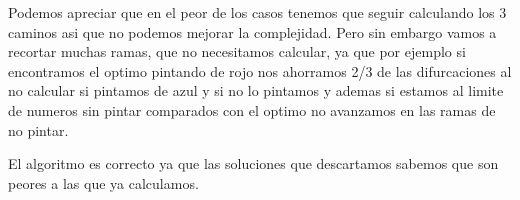 Podemos apreciar que en el peor de los casos tenemos que seguir calculando los 3 caminos asi que no podemos mejorar la complejidad. Pero sin embargo vamos a recortar muchas ramas, que no necesitamos calcular, ya que por ejemplo si encontramos el optimo pintando de rojo nos ahorramos 2/3 de las difurcaciones al no calcular si pintamos de azul y si no lo pintamos y ademas si estamos al limite de numeros sin pintar comparados con el optimo no avanzamos en las ramas de no pintar.

El algoritmo es correcto ya que las soluciones que descartamos sabemos que son peores a las que ya calculamos.

   
